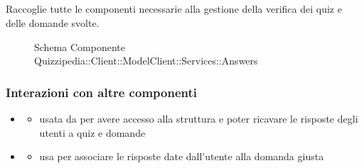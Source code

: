 \subsection{}
Raccoglie tutte le componenti necessarie alla gestione della verifica dei quiz e delle domande svolte.
\begin{figure}[H]
\centering
\noindent{}
\caption[Schema Componente Quizzipedia::Client::ModelClient::Services::Answers]{Schema Componente Quizzipedia::Client::ModelClient::Services::Answers}
\end{figure}
\subsubsection{Interazioni con altre componenti}
\begin{itemize}
\item {}
\begin{itemize}
\item usata da  per avere accesso alla struttura e poter ricavare le risposte degli utenti a quiz e domande
\end{itemize}
\item {}
\begin{itemize}
\item usa  per associare le risposte date dall'utente alla domanda giusta
\end{itemize}
\end{itemize}
